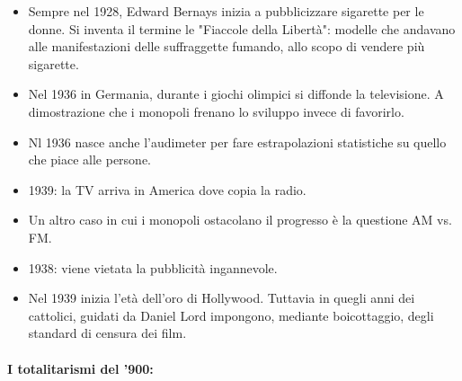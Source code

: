 \begin{itemize}
  \item Sempre nel 1928, Edward Bernays inizia a pubblicizzare sigarette per le donne. Si inventa il termine le "Fiaccole della Libertà": modelle che andavano alle manifestazioni delle suffraggette fumando, allo scopo di vendere più sigarette.
  \item Nel 1936 in Germania, durante i giochi olimpici si diffonde la televisione. A dimostrazione che i monopoli frenano lo sviluppo invece di favorirlo. 
  \item Nl 1936 nasce anche l'audimeter per fare estrapolazioni statistiche su quello che piace alle persone. 
  \item 1939: la TV arriva in America dove copia la radio. 
  \item Un altro caso in cui i monopoli ostacolano il progresso è la questione AM vs. FM. 
  \item 1938: viene vietata la pubblicità ingannevole. 
  \item Nel 1939 inizia l'età dell'oro di Hollywood. Tuttavia in quegli anni dei cattolici, guidati da Daniel Lord impongono, mediante boicottaggio, degli standard di censura dei film.
\end{itemize}

\paragraph{I totalitarismi del '900:}

